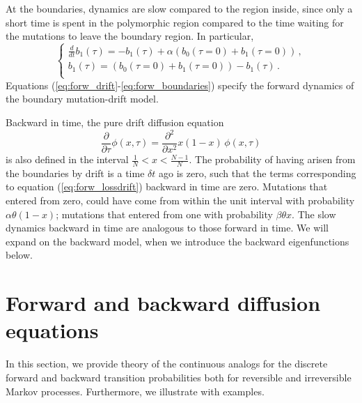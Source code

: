 \documentclass[preprint]{elsarticle}
\begin{document}
At the boundaries, dynamics are slow compared to the region inside, since only a short time is spent in the polymorphic region compared to the time waiting for the mutations to leave the boundary region. In particular, 
\begin{equation}\label{eq:forw_boundaries}
    \begin{cases}
    \frac{d}{dt}b_1(\tau)=-b_1(\tau)+\alpha(b_0(\tau=0)+b_1(\tau=0))\,,\\
    b_1(\tau)=(b_0(\tau=0)+b_1(\tau=0))-b_1(\tau)\,.\\
    \end{cases}
\end{equation}
Equations (\ref{eq:forw_drift}-\ref{eq:forw_boundaries}) specify the forward dynamics of the boundary mutation-drift model.

Backward in time, the pure drift diffusion equation
\begin{equation}\label{eq:forw_drift}
  \frac{\partial}{\partial \tau} \phi(x,\tau) =\frac{\partial^2}{\partial x^2}x(1-x)\,\phi(x,\tau) 
\end{equation}
is also defined in the interval $\frac1N<x<\frac{N-1}N$. The probability of having arisen from the boundaries by drift is a time $\delta t$ ago is zero, such that the terms corresponding to equation (\ref{eq:forw_lossdrift}) backward in time are zero. Mutations that entered from zero, could have come from within the unit interval with probability $\alpha\theta(1-x)$; mutations that entered from one with probability $\beta\theta x$. The slow dynamics backward in time are analogous to those forward in time. We will expand on the backward model, when we introduce the backward eigenfunctions below.

\section{Forward and backward diffusion equations}\label{forwBackDiff}

In this section, we provide theory of the continuous analogs for the discrete forward and backward transition probabilities both for reversible and irreversible Markov processes. Furthermore, we illustrate with examples.
\end{document}

